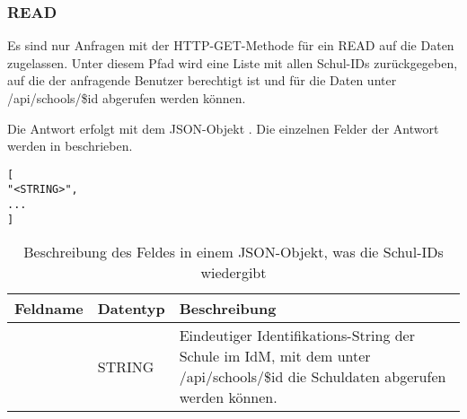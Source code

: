 \subsubsection{READ}
\label{sec:rest:api:schools:read}
Es sind nur Anfragen mit der HTTP-GET-Methode für ein READ auf die Daten zugelassen.
Unter diesem Pfad wird eine Liste mit allen Schul-IDs zurückgegeben, auf die der anfragende Benutzer berechtigt ist und für die Daten unter /api/schools/\$id abgerufen werden können.

Die Antwort erfolgt mit dem JSON-Objekt . 
Die einzelnen Felder der Antwort werden in  beschrieben.

\begin{lstlisting}[caption={JSON-Antwort für einen GET-Aufruf des Pfads /api/schools},label={lst:code:rest:api:schools:read:ret},frame=tlrb]
[
"<STRING>",
...
]
\end{lstlisting}

\begin{longtable}{|p{}|p{}|p{}|}
		\caption{Beschreibung des Feldes in einem JSON-Objekt, was die Schul-IDs wiedergibt}
\endfoot
		\caption{Beschreibung des Feldes in einem JSON-Objekt, was die Schul-IDs wiedergibt}
		\label{tab:rest:api:schools:read:ret}
\endlastfoot 
\hline
			\textbf{Feldname} & \textbf{Datentyp} & \textbf{Beschreibung} \\ \hline
\endhead
 & STRING & Eindeutiger Identifikations-String der Schule im IdM, mit dem unter /api/schools/\$id die Schuldaten abgerufen werden können.\\ \hline
\end{longtable}
